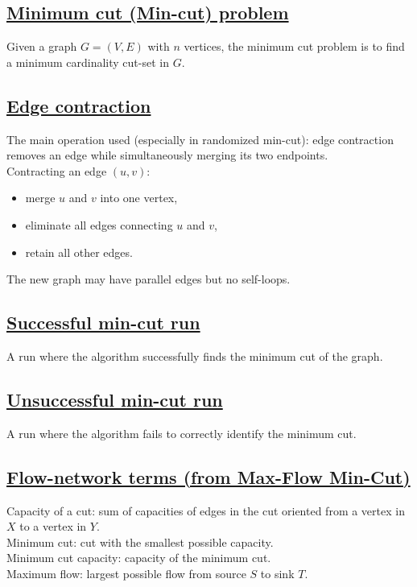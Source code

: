 \documentclass[11pt]{article}
\begin{document}
\subsection*{\underline{Minimum cut (Min-cut) problem}}
Given a graph $G = (V, E)$ with $n$ vertices, the minimum cut problem is to find a minimum cardinality cut-set in $G$.

\subsection*{\underline{Edge contraction}}
The main operation used (especially in randomized min-cut): edge contraction removes an edge while simultaneously merging its two endpoints.\\
Contracting an edge $(u, v)$:
\begin{itemize}
\item merge $u$ and $v$ into one vertex,
\item eliminate all edges connecting $u$ and $v$,
\item retain all other edges.
\end{itemize}
The new graph may have parallel edges but no self-loops.

\subsection*{\underline{Successful min-cut run}}
A run where the algorithm successfully finds the minimum cut of the graph.

\subsection*{\underline{Unsuccessful min-cut run}}
A run where the algorithm fails to correctly identify the minimum cut.

\subsection*{\underline{Flow-network terms (from Max-Flow Min-Cut)}}
Capacity of a cut: sum of capacities of edges in the cut oriented from a vertex in $X$ to a vertex in $Y$.\\
Minimum cut: cut with the smallest possible capacity.\\
Minimum cut capacity: capacity of the minimum cut.\\
Maximum flow: largest possible flow from source $S$ to sink $T$.

\vspace{1cm}
\end{document}
